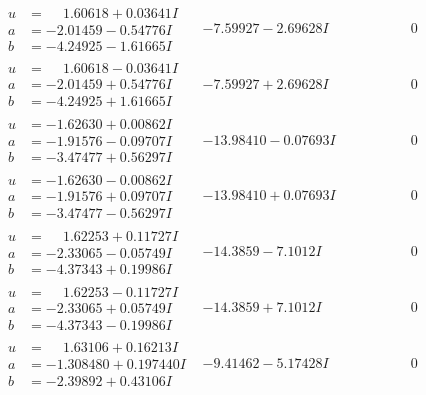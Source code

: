 \documentclass[1p]{elsarticle_modified}
\theoremstyle{definition}
\begin{document}
$$\begin{array}{c|c|c}
\begin{aligned}
u &= \phantom{-}1.60618 + 0.03641 I \\
a &= -2.01459 - 0.54776 I \\
b &= -4.24925 - 1.61665 I\end{aligned}
 & -7.59927 - 2.69628 I & \phantom{-0.000000 } 0 \\ \hline\begin{aligned}
u &= \phantom{-}1.60618 - 0.03641 I \\
a &= -2.01459 + 0.54776 I \\
b &= -4.24925 + 1.61665 I\end{aligned}
 & -7.59927 + 2.69628 I & \phantom{-0.000000 } 0 \\ \hline\begin{aligned}
u &= -1.62630 + 0.00862 I \\
a &= -1.91576 - 0.09707 I \\
b &= -3.47477 + 0.56297 I\end{aligned}
 & -13.98410 - 0.07693 I & \phantom{-0.000000 } 0 \\ \hline\begin{aligned}
u &= -1.62630 - 0.00862 I \\
a &= -1.91576 + 0.09707 I \\
b &= -3.47477 - 0.56297 I\end{aligned}
 & -13.98410 + 0.07693 I & \phantom{-0.000000 } 0 \\ \hline\begin{aligned}
u &= \phantom{-}1.62253 + 0.11727 I \\
a &= -2.33065 - 0.05749 I \\
b &= -4.37343 + 0.19986 I\end{aligned}
 & -14.3859 - 7.1012 I & \phantom{-0.000000 } 0 \\ \hline\begin{aligned}
u &= \phantom{-}1.62253 - 0.11727 I \\
a &= -2.33065 + 0.05749 I \\
b &= -4.37343 - 0.19986 I\end{aligned}
 & -14.3859 + 7.1012 I & \phantom{-0.000000 } 0 \\ \hline\begin{aligned}
u &= \phantom{-}1.63106 + 0.16213 I \\
a &= -1.308480 + 0.197440 I \\
b &= -2.39892 + 0.43106 I\end{aligned}
 & -9.41462 - 5.17428 I & \phantom{-0.000000 } 0 \\ \hline\begin{aligned}

\end{aligned}
\end{array}$$
\end{document}
